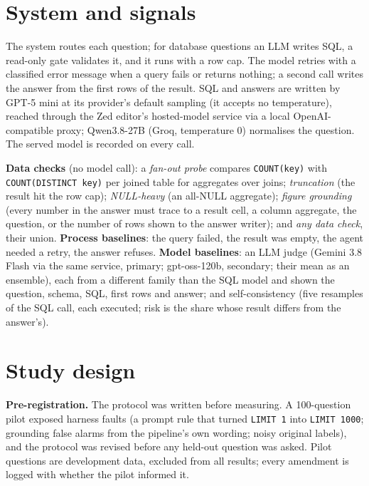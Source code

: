 \documentclass[10pt,twocolumn]{article}
\begin{document}
\section{System and signals}

The system routes each question; for database questions an LLM writes SQL, a read-only gate validates
it, and it runs with a row cap. The model retries with a classified error message when a query fails
or returns nothing; a second call writes the answer from the first rows of the result. SQL and answers
are written by GPT-5 mini at its provider's default sampling (it accepts no temperature), reached
through the Zed editor's hosted-model service via a local OpenAI-compatible proxy; Qwen3.8-27B (Groq,
temperature 0) normalises the question. The served model is recorded on every call.

\textbf{Data checks} (no model call): a \emph{fan-out probe} compares \texttt{COUNT(key)} with
\texttt{COUNT(DISTINCT key)} per joined table for aggregates over joins; \emph{truncation} (the result
hit the row cap); \emph{NULL-heavy} (an all-NULL aggregate); \emph{figure grounding} (every number in
the answer must trace to a result cell, a column aggregate, the question, or the number of rows shown
to the answer writer); and \emph{any data check}, their union. \textbf{Process baselines}: the query
failed, the result was empty, the agent needed a retry, the answer refuses. \textbf{Model baselines}:
an LLM judge (Gemini 3.8 Flash via the same service, primary; gpt-oss-120b, secondary; their mean as
an ensemble), each
from a different family than the SQL model and shown the question, schema, SQL, first rows and answer;
and self-consistency (five resamples of the SQL call, each executed; risk is the share whose result
differs from the answer's).

\section{Study design}

\textbf{Pre-registration.} The protocol was written before measuring. A 100-question pilot exposed
harness faults (a prompt rule that turned \texttt{LIMIT 1} into \texttt{LIMIT 1000}; grounding false
alarms from the pipeline's own wording; noisy original labels), and the protocol was revised before
any held-out question was asked. Pilot questions are development data, excluded from all results;
every amendment is logged with whether the pilot informed it.
\end{document}
